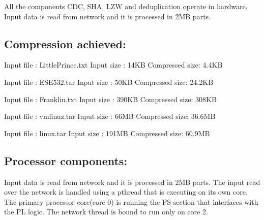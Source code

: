 \documentclass{article}
\begin{document}
All the components CDC, SHA, LZW and deduplication operate in hardware. 
Input data is read from network and it is processed in 2MB parts. 

\subsection{Compression achieved:}

    Input file : LittlePrince.txt       
    \newline
    Input size : 14KB
    \newline
    Compressed size: 4.4KB
    \newline\newline
    
    Input file : ESE532.tar       
    \newline
    Input size : 50KB
    \newline
    Compressed size: 24.2KB
    \newline\newline

    Input file : Franklin.txt       
    \newline
    Input size : 390KB
    \newline
    Compressed size: 308KB
    \newline\newline

    Input file : vmlinuz.tar       
    \newline
    Input size : 66MB
    \newline
    Compressed size: 36.6MB
    \newline\newline

    Input file : linux.tar       
    \newline
    Input size : 191MB
    \newline
    Compressed size: 60.9MB
    \newline\newline


\subsection{Processor components:}

Input data is read from network and it is processed in 2MB parts. 
\newline
The input read over the network is handled using a pthread that is executing on its own core. 
\newline
The primary processor core(core 0) is running the PS section that interfaces with the PL logic. 
\newline
The network thread is bound to run only on core 2. 
\newline
\end{document}
